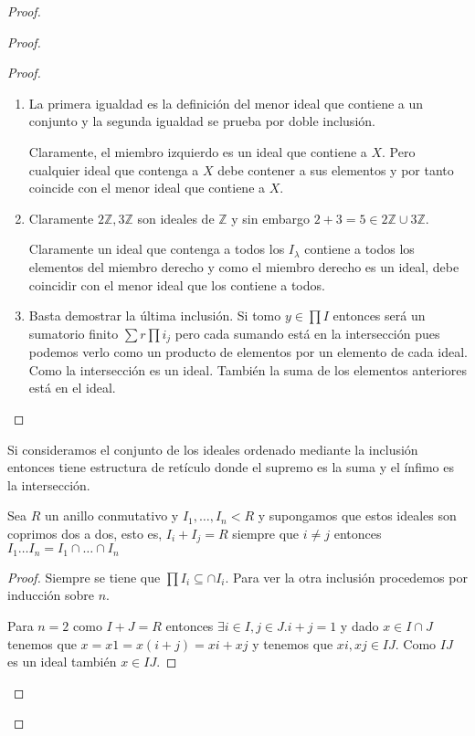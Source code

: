 \begin{proof}
\begin{proof}
\begin{proof}
\begin{enumerate}
		\item La primera igualdad es la definición del menor ideal que contiene a un conjunto y la segunda igualdad se prueba por doble inclusión. 
		
		Claramente, el miembro izquierdo es un ideal que contiene a $X$. Pero cualquier ideal que contenga a $X$ debe contener a sus elementos y por tanto coincide con el menor ideal que contiene a $X$.
		
		\item Claramente $2\mathbb{Z},3\mathbb{Z}$ son ideales de $\mathbb{Z}$ y sin embargo $2+3 = 5 \in 2\mathbb{Z} \cup 3\mathbb{Z}$. 
		
		Claramente un ideal que contenga a todos los $I_\lambda$ contiene a todos los elementos del miembro derecho y como el miembro derecho es un ideal, debe coincidir con el menor ideal que los contiene a todos. 
		
		\item Basta demostrar la última inclusión. Si tomo $y \in \prod I$ entonces será un sumatorio finito $\sum r \prod i_j$  pero cada sumando está en la intersección pues podemos verlo como un producto de elementos por un elemento de cada ideal. Como la intersección es un ideal. También la suma de los elementos anteriores está en el ideal. 
	\end{enumerate}
\end{proof}

\begin{corollary}
Si consideramos el conjunto de los ideales ordenado mediante la inclusión entonces tiene estructura de retículo donde el supremo es la suma y el ínfimo es la intersección. 
\end{corollary}

\begin{proposition}
	Sea $R$ un anillo conmutativo y $I_1,\ldots,I_n < R$ y supongamos que estos ideales son coprimos dos a dos, esto es, $I_i+I_j = R$ siempre que $i \neq j$ entonces $I_1 \ldots I_n = I_1 \cap \ldots \cap I_n$
\end{proposition}
\begin{proof}
	Siempre se tiene que $\prod I_i \subseteq \cap I_i$. Para ver la otra inclusión procedemos por inducción sobre $n$. 
	
	Para $n = 2$ como $I+J = R$ entonces $\exists i \in I,j \in J.i+j = 1$ y dado $x \in I \cap J$ tenemos que $x = x1 = x(i+j) = xi + xj$ y tenemos que $xi,xj \in IJ$. Como $IJ$ es un ideal también $x \in IJ$. 
	

\end{proof}
\end{proof}
\end{proof}
